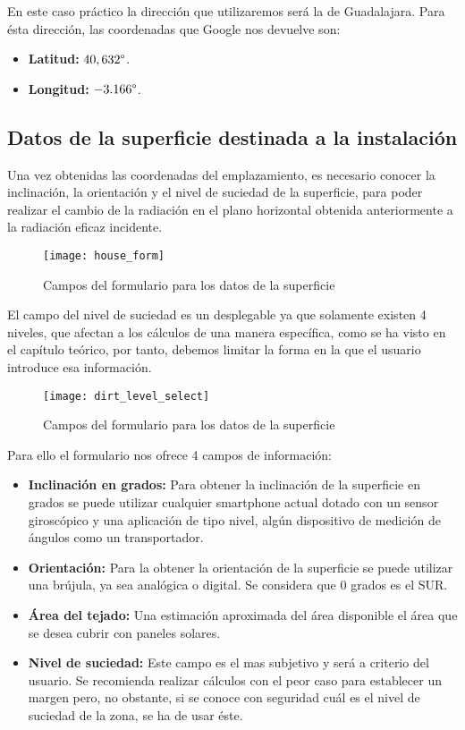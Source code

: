 En este caso práctico la dirección que utilizaremos será la de Guadalajara. Para ésta dirección, las coordenadas que Google nos devuelve son:
\begin{itemize}
\item \textbf{Latitud:} $40,632 \degree$.
\item \textbf{Longitud:} $-3.166 \degree$.
\end{itemize}

\subsection{Datos de la superficie destinada a la instalación}

Una vez obtenidas las coordenadas del emplazamiento, es necesario conocer la inclinación, la orientación y el nivel de suciedad de la superficie, para poder realizar el cambio de la radiación en el plano horizontal obtenida anteriormente a la radiación eficaz incidente.

\begin{figure}[ht]
\texttt{[image: house\_form]}
\centering
\caption{Campos del formulario para los datos de la superficie}
\label{fig:house_form}
\end{figure}

\newpage

El campo del nivel de suciedad es un desplegable ya que solamente existen 4 niveles, que afectan a los cálculos de una manera específica, como se ha visto en el capítulo teórico, por tanto, debemos limitar la forma en la que el usuario introduce esa información.

\begin{figure}[ht]
\texttt{[image: dirt\_level\_select]}
\centering
\caption{Campos del formulario para los datos de la superficie}
\label{fig:dirt_level_input}
\end{figure}


Para ello el formulario nos ofrece 4 campos de información:

\begin{itemize}
\item \textbf{Inclinación en grados:} Para obtener la inclinación de la superficie en grados se puede utilizar cualquier smartphone actual dotado con un sensor giroscópico y una aplicación de tipo nivel, algún dispositivo de medición de ángulos como un transportador.
\item \textbf{Orientación:} Para la obtener la orientación de la superficie se puede utilizar una brújula, ya sea analógica o digital. Se considera que 0 grados es el SUR.
\item \textbf{Área del tejado:} Una estimación aproximada del área disponible el área que se desea cubrir con paneles solares.
\item \textbf{Nivel de suciedad:} Este campo es el mas subjetivo y será a criterio del usuario. Se recomienda realizar cálculos con el peor caso para establecer un margen pero, no obstante, si se conoce con seguridad cuál es el nivel de suciedad de la zona, se ha de usar éste.
\end{itemize}


